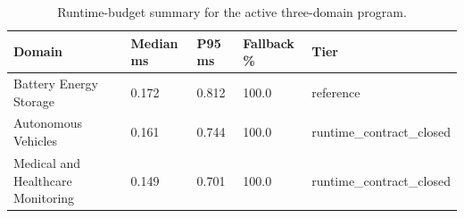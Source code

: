 \begin{table}[htbp]
\centering
\caption{Runtime-budget summary for the active three-domain program.}
\label{tbl:orius-runtime-budget-matrix}
\begin{tabular}{lllll}
\toprule
Domain & Median ms & P95 ms & Fallback \% & Tier\\
\midrule
Battery Energy Storage & 0.172 & 0.812 & 100.0 & reference\\
Autonomous Vehicles & 0.161 & 0.744 & 100.0 & runtime\_contract\_closed\\
Medical and Healthcare Monitoring & 0.149 & 0.701 & 100.0 & runtime\_contract\_closed\\
\bottomrule
\end{tabular}
\end{table}
